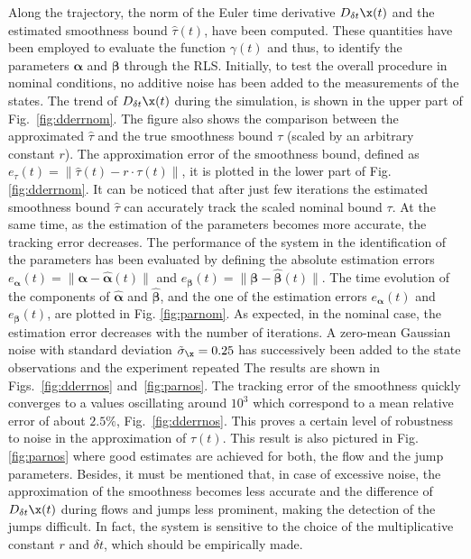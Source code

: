 Along the trajectory, the norm of the Euler time derivative $D_{\delta t}\x(t)$ and the estimated smoothness bound $\hat{\tau}(t)$, have been computed. These quantities have been employed to evaluate the function $\gamma(t)$ and thus, to identify the parameters $\bm{\alpha}$ and $\bm{\beta}$ through the RLS. Initially, to test the overall procedure in nominal conditions, no additive noise has been added to the measurements of the states.
The trend of $D_{\delta t}\x(t)$ during the simulation, is shown in the upper part of Fig.~\ref{fig:dderrnom}. The figure also shows the comparison between the approximated $\hat{\tau}$ and the true smoothness bound $\tau$ (scaled by an arbitrary constant $r$). The approximation error of the smoothness bound, defined as $e_{\tau}(t)=\|\hat{\tau}(t)-r\cdot\tau(t)\|$, it is plotted in the lower part of Fig. \ref{fig:dderrnom}. 
It can be noticed that after just few iterations the estimated smoothness bound $\hat{\tau}$ can accurately track the scaled nominal bound $\tau$. At the same time, as the estimation of the parameters becomes more accurate,  the tracking error decreases. 
The performance of the system in the identification of the parameters has been evaluated by defining the absolute estimation errors
$e_{\bm{\alpha}}(t)=\|\bm{\alpha}-\hat{\bm{\alpha}}(t)\|$ and $ e_{\bm{\beta}}(t)=\|\bm{\beta}-\hat{\bm{\beta}}(t)\|$.
%
The time evolution of the components of $\hat{\bm{\alpha}}$ and $\hat{\bm{\beta}}$, and the one of the estimation errors $e_{\bm{\alpha}}(t)$ and $e_{\bm{\beta}}(t)$, are plotted in Fig. \ref{fig:parnom}.
%
As expected, in the nominal case, the estimation error decreases with the number of iterations. 
A zero-mean Gaussian noise with standard deviation $\tilde{\sigma}_{\x}=0.25$ has successively been added to the state observations and the experiment repeated %
The results are shown in Figs.~\ref{fig:dderrnos} and~\ref{fig:parnos}.
%
%
 The tracking error of the smoothness quickly converges to a values oscillating around $10^3$ which correspond to a mean relative error of about $2.5\%$, Fig.~\ref{fig:dderrnos}. This proves a certain level of robustness to noise in the approximation of $\tau(t)$. This result is also pictured in Fig. \ref{fig:parnos} where good estimates are achieved for both, the flow and the jump parameters. Besides, it must be mentioned that, in case of excessive noise, the approximation of the smoothness becomes less accurate and the difference of $D_{\delta t}\x(t)$ during flows and jumps less prominent, making the detection of the jumps difficult. In fact, the system is sensitive to the choice of the multiplicative constant $r$ and $\delta t$, which should be empirically made. 
